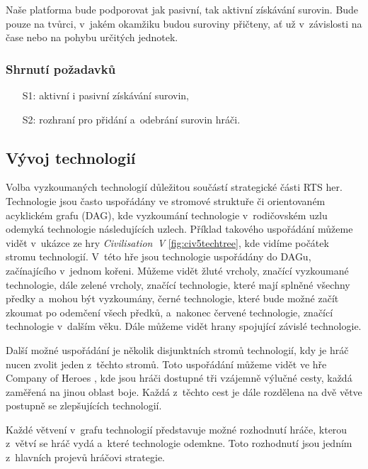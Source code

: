 Naše platforma bude podporovat jak pasivní, tak aktivní získávání surovin. Bude pouze na tvůrci, v~jakém okamžiku budou suroviny přičteny, ať už v~závislosti na čase nebo na pohybu určitých jednotek. 

\subsubsection{Shrnutí požadavků}

\begin{itemize}
	\item[S1:] aktivní i pasivní získávání surovin,
	\item[S2:] rozhraní pro přidání a~odebrání surovin hráči.
\end{itemize}

\subsection{Vývoj technologií}
\label{sec:vyzkum}
Volba vyzkoumaných technologií důležitou součástí strategické části RTS her. Technologie jsou často uspořádány ve stromové struktuře či orientovaném acyklickém grafu (DAG), kde vyzkoumání technologie v~rodičovském uzlu odemyká technologie následujících uzlech. Příklad takového uspořádání můžeme vidět v~ukázce ze hry \emph{Civilisation~V} \citep{site:civ5}\ref{fig:civ5techtree}, kde vidíme počátek stromu technologií. V~této hře jsou technologie uspořádány do DAGu, začínajícího v~jednom kořeni. Můžeme vidět žluté vrcholy, značící vyzkoumané technologie, dále zelené vrcholy, značící technologie, které mají splněné všechny předky a~mohou být vyzkoumány, černé technologie, které bude možné začít zkoumat po odemčení všech předků, a~nakonec červené technologie, značící technologie v~dalším věku. Dále můžeme vidět hrany spojující závislé technologie. 

Další možné uspořádání je několik disjunktních stromů technologií, kdy je hráč nucen zvolit jeden z~těchto stromů. 
Toto uspořádání můžeme vidět ve hře Company of Heroes \citep{site:COH}, kde jsou hráči dostupné tři vzájemně výlučné cesty, každá zaměřená na jinou oblast boje. Každá z~těchto cest je dále rozdělena na dvě větve postupně se zlepšujících technologií.

Každé větvení v~grafu technologií představuje možné rozhodnutí hráče, kterou z~větví se hráč vydá a~které technologie odemkne. Toto rozhodnutí jsou jedním z~hlavních projevů hráčovi strategie.

